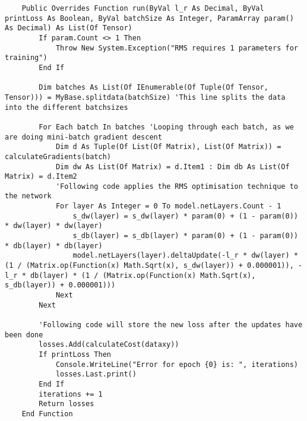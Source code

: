 \begin{verbatim}
    Public Overrides Function run(ByVal l_r As Decimal, ByVal printLoss As Boolean, ByVal batchSize As Integer, ParamArray param() As Decimal) As List(Of Tensor)
        If param.Count <> 1 Then
            Throw New System.Exception("RMS requires 1 parameters for training")
        End If

        Dim batches As List(Of IEnumerable(Of Tuple(Of Tensor, Tensor))) = MyBase.splitdata(batchSize) 'This line splits the data into the different batchsizes

        For Each batch In batches 'Looping through each batch, as we are doing mini-batch gradient descent
            Dim d As Tuple(Of List(Of Matrix), List(Of Matrix)) = calculateGradients(batch)
            Dim dw As List(Of Matrix) = d.Item1 : Dim db As List(Of Matrix) = d.Item2
            'Following code applies the RMS optimisation technique to the network
            For layer As Integer = 0 To model.netLayers.Count - 1
                s_dw(layer) = s_dw(layer) * param(0) + (1 - param(0)) * dw(layer) * dw(layer)
                s_db(layer) = s_db(layer) * param(0) + (1 - param(0)) * db(layer) * db(layer)
                model.netLayers(layer).deltaUpdate(-l_r * dw(layer) * (1 / (Matrix.op(Function(x) Math.Sqrt(x), s_dw(layer)) + 0.000001)), -l_r * db(layer) * (1 / (Matrix.op(Function(x) Math.Sqrt(x), s_db(layer)) + 0.000001)))
            Next
        Next

        'Following code will store the new loss after the updates have been done
        losses.Add(calculateCost(dataxy))
        If printLoss Then
            Console.WriteLine("Error for epoch {0} is: ", iterations)
            losses.Last.print()
        End If
        iterations += 1
        Return losses
    End Function
\end{verbatim}

